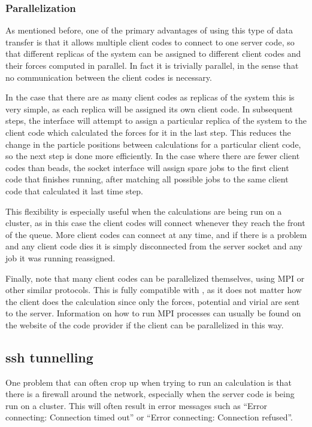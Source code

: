 \documentclass[11pt,english,fleqn]{report}
\begin{document}
\subsubsection{Parallelization}

As mentioned before, one of the primary advantages of using this type
of data transfer is that it allows multiple client codes to connect
to one server code, so that different replicas of the system can be
assigned to different client codes and their forces computed in parallel.
In fact it is trivially parallel, in the sense that no communication
between the client codes is necessary.

In the case that there are as many client codes as replicas of the
system this is very simple, as each replica will be assigned its own
client code. In subsequent steps, the interface will attempt to assign
a particular replica of the system to the client code which calculated
the forces for it in the last step. This reduces the change in the particle
positions between calculations for a particular client code, so the
next step is done more efficiently. In the case where there are fewer
client codes than beads, the socket interface will assign spare jobs
to the first client code that finishes running, after matching all
possible jobs to the same client code that calculated it last time
step.

This flexibility is especially useful when the calculations are being
run on a cluster, as in this case the client codes will connect whenever
they reach the front of the queue. More client codes can connect at
any time, and if there is a problem and any client code dies it is
simply disconnected from the server socket and any job it was running
reassigned.

Finally, note that many client codes can be parallelized themselves,
using MPI or other similar protocols. This is fully compatible with
\ipi, as it does not matter how the client does the calculation since
only the forces, potential and virial are sent to the server. Information
on how to run MPI processes can usually be found on the website of
the code provider if the client can be parallelized in this way.


\subsection{ssh tunnelling}

\label{ssh_sockets}

One problem that can often crop up when trying to run an \ipi calculation
is that there is a firewall around the network, especially when the
server code is being run on a cluster. This will often result in error
messages such as {}``Error connecting: Connection timed out'' or
{}``Error connecting: Connection refused''.
\end{document}
